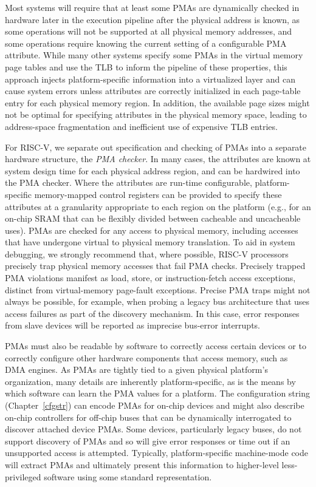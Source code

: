 Most systems will require that at least some PMAs are dynamically
checked in hardware later in the execution pipeline after the physical
address is known, as some operations will not be supported at all
physical memory addresses, and some operations require knowing the
current setting of a configurable PMA attribute.  While many other systems
specify some PMAs in the virtual memory page tables and use the TLB to
inform the pipeline of these properties, this approach injects platform-specific
information into a virtualized layer and can cause system errors
unless attributes are correctly initialized in each page-table entry
for each physical memory region.  In addition, the available
page sizes might not be optimal for specifying attributes in the
physical memory space, leading to address-space fragmentation and
inefficient use of expensive TLB entries.

For RISC-V, we separate out specification and checking of PMAs into a
separate hardware structure, the {\em PMA checker}.  In many cases,
the attributes are known at system design time for each physical
address region, and can be hardwired into the PMA checker.  Where the
attributes are run-time configurable, platform-specific memory-mapped
control registers can be provided to specify these attributes at a
granularity appropriate to each region on the platform (e.g., for an
on-chip SRAM that can be flexibly divided between cacheable and
uncacheable uses).  PMAs are checked for any access to physical
memory, including accesses that have undergone virtual to physical
memory translation.  To aid in system debugging, we strongly recommend
that, where possible, RISC-V processors precisely trap physical memory
accesses that fail PMA checks.  Precisely trapped PMA violations manifest
as load, store, or instruction-fetch access exceptions, distinct from
virtual-memory page-fault exceptions. Precise PMA traps might not always be
possible, for example, when probing a legacy bus architecture that
uses access failures as part of the discovery mechanism.  In this
case, error responses from slave devices will be reported as imprecise
bus-error interrupts.

PMAs must also be readable by software to correctly access certain
devices or to correctly configure other hardware components that
access memory, such as DMA engines.  As PMAs are tightly tied to a
given physical platform's organization, many details are inherently
platform-specific, as is the means by which software can learn the PMA
values for a platform.  The configuration string
(Chapter~\ref{cfgstr}) can encode PMAs for on-chip devices and might
also describe on-chip controllers for off-chip buses that can be
dynamically interrogated to discover attached device PMAs.  Some
devices, particularly legacy buses, do not support discovery of PMAs
and so will give error responses or time out if an unsupported access
is attempted.  Typically, platform-specific machine-mode code will
extract PMAs and ultimately present this information to higher-level
less-privileged software using some standard representation.

